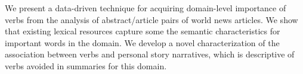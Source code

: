 We present a data-driven technique for acquiring domain-level importance of verbs from the analysis of abstract/article pairs of world news articles. We show that existing lexical resources capture some the semantic characteristics for important words in the domain. We develop a novel characterization of the association between verbs and personal story narratives, which is descriptive of verbs avoided in summaries for this domain.
